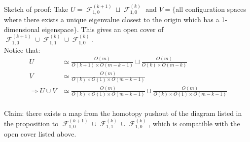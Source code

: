 \documentclass{article}
\newtheorem{proposed work}[theorem]{Proposed Work}
\DeclareMathOperator{\CF}{\mathcal F}
\begin{document}
Sketch of proof: Take $U=\CF_{1,0}^{(k+1)}\sqcup \CF_{1,0}^{(k)}$ and $V=\lbrace$all configuration spaces where there exists a unique eigenvalue closest to the origin which has a 1-dimensional eigenspace$\rbrace$. This gives an open cover of $\CF_{1,0}^{(k+1)}\cup \CF_{1,1}^{(k)}\cup \CF_{1,0}^{(k)}$.\\

Notice that: 
\begin{align*}
U &\simeq \frac{O(m)}{O(k+1)\times O(m-k-1)}\sqcup \frac{O(m)}{O(k)\times O(m-k)}\\
V &\simeq \frac{O(m)}{O(k)\times O(1)\times O(m-k-1)}\\
\Rightarrow U\cup V &\simeq \frac{O(m)}{O(k)\times O(1)\times O(m-k-1)}\sqcup \frac{O(m)}{O(k)\times O(1)\times O(m-k-1)}\\
\end{align*}

Claim: there exists a map from the homotopy pushout of the diagram listed in the proposition to $\CF_{1,0}^{(k+1)}\cup \CF_{1,1}^{(k)}\cup \CF_{1,0}^{(k)}$, which is compatible with the open cover listed above. 



\printbibliography
\end{document}
